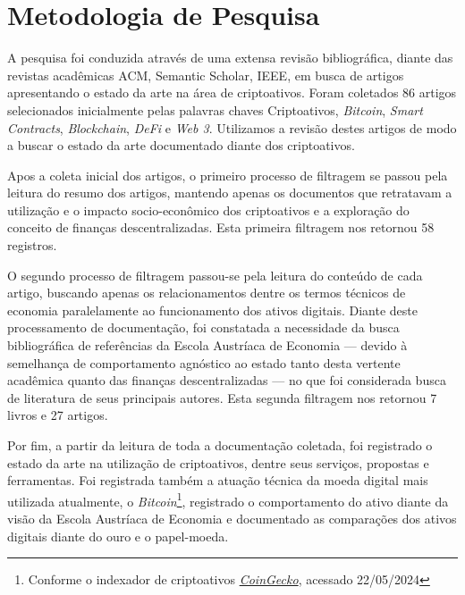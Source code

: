 \chapter{Metodologia de Pesquisa}
A pesquisa foi conduzida através de uma extensa revisão bibliográfica, diante das revistas acadêmicas ACM, Semantic Scholar, IEEE, em busca de artigos apresentando o estado da arte na área de criptoativos. Foram coletados 86 artigos selecionados inicialmente pelas palavras chaves Criptoativos, \textit{Bitcoin}, \textit{Smart Contracts}, \textit{Blockchain}, \textit{DeFi} e \textit{Web 3}. Utilizamos a revisão destes artigos de modo a buscar o estado da arte documentado diante dos criptoativos.

Apos a coleta inicial dos artigos, o primeiro processo de filtragem se passou pela leitura do resumo dos artigos, mantendo apenas os documentos que retratavam a utilização e o impacto socio-econômico dos criptoativos e a exploração do conceito de finanças descentralizadas. Esta primeira filtragem nos retornou 58 registros. 

O segundo processo de filtragem passou-se pela leitura do conteúdo de cada artigo, buscando apenas os relacionamentos dentre os termos técnicos de economia paralelamente ao funcionamento dos ativos digitais. Diante deste processamento de documentação, foi constatada a necessidade da busca bibliográfica de referências da Escola Austríaca de Economia — devido à semelhança de comportamento agnóstico ao estado tanto desta vertente acadêmica quanto das finanças descentralizadas — no que foi considerada busca de literatura de seus principais autores. Esta segunda filtragem nos retornou 7 livros e 27 artigos.

Por fim, a partir da leitura de toda a documentação coletada, foi registrado o estado da arte na utilização de criptoativos, dentre seus serviços, propostas e ferramentas. Foi registrada também a atuação técnica da moeda digital mais utilizada atualmente, o \textit{Bitcoin}\footnote{Conforme o indexador de criptoativos \href{https://www.coingecko.com/pt}{\textit{CoinGecko}}, acessado 22/05/2024}, registrado o comportamento do ativo diante da visão da Escola Austríaca de Economia e documentado as comparações dos ativos digitais diante do ouro e o papel-moeda.









